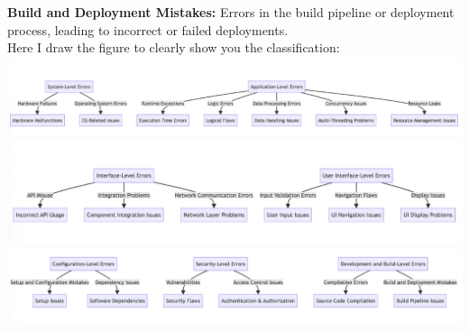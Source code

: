 \documentclass[12pt]{article}
\numberwithin{table}{section}
\begin{document}
\textbf{Build and Deployment Mistakes:} Errors in the build pipeline or deployment process, leading to incorrect or failed deployments.\\

Here I draw the figure to clearly show you the classification:
\\
\includegraphics[width=1.2\textwidth]{1.eps}
\includegraphics[width=1.2\textwidth]{2.eps}
\includegraphics[width=1.2\textwidth]{3.eps}
\end{document}
